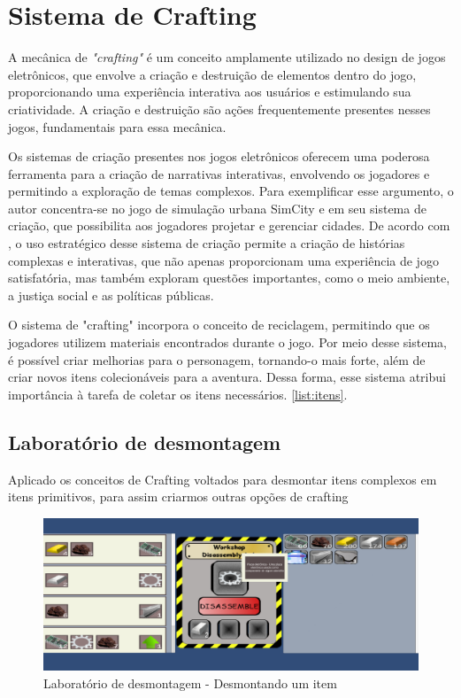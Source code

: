 \pagebreak
\section{Sistema de Crafting}
\label{craft}
A mecânica de \textit{"crafting"} é um conceito amplamente utilizado no design de jogos eletrônicos, que envolve a criação e destruição de elementos dentro do jogo, proporcionando uma experiência interativa aos usuários e estimulando sua criatividade. A criação e destruição são ações frequentemente presentes nesses jogos, fundamentais para essa mecânica.

Os sistemas de criação presentes nos jogos eletrônicos oferecem uma poderosa ferramenta para a criação de narrativas interativas, envolvendo os jogadores e permitindo a exploração de temas complexos. Para exemplificar esse argumento, o autor concentra-se no jogo de simulação urbana SimCity e em seu sistema de criação, que possibilita aos jogadores projetar e gerenciar cidades. De acordo com \cite{craftingGames}, o uso estratégico desse sistema de criação permite a criação de histórias complexas e interativas, que não apenas proporcionam uma experiência de jogo satisfatória, mas também exploram questões importantes, como o meio ambiente, a justiça social e as políticas públicas.

O sistema de "crafting" incorpora o conceito de reciclagem, permitindo que os jogadores utilizem materiais encontrados durante o jogo. Por meio desse sistema, é possível criar melhorias para o personagem, tornando-o mais forte, além de criar novos itens colecionáveis para a aventura. Dessa forma, esse sistema atribui importância à tarefa de coletar os itens necessários. \ref{list:itens}.

\subsection{Laboratório de desmontagem}
Aplicado os conceitos de Crafting voltados para desmontar itens complexos em itens primitivos, para assim criarmos outras opções de crafting
\begin{figure}[h]
    \centering
    \includegraphics[width=500px]{figuras/disassembly.png}
    \caption{Laboratório de desmontagem - Desmontando um item}
    \label{fig_disassembler}
\end{figure}


